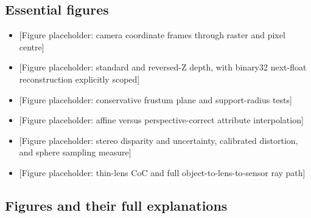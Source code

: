 \subsection{Essential figures}\label{essential-figures}

\begin{itemize}
\tightlist
\item
  {[}Figure placeholder: camera coordinate frames through raster and pixel centre{]}
\item
  {[}Figure placeholder: standard and reversed-Z depth, with binary32 next-float reconstruction explicitly scoped{]}
\item
  {[}Figure placeholder: conservative frustum plane and support-radius tests{]}
\item
  {[}Figure placeholder: affine versus perspective-correct attribute interpolation{]}
\item
  {[}Figure placeholder: stereo disparity and uncertainty, calibrated distortion, and sphere sampling measure{]}
\item
  {[}Figure placeholder: thin-lens CoC and full object-to-lens-to-sensor ray path{]}
\end{itemize}

\subsection{Figures and their full explanations}\label{figures-and-their-full-explanations}

